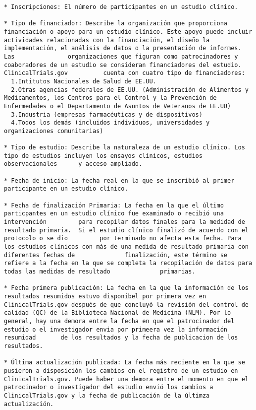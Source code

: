 \documentclass[
]{article}
\begin{document}
\begin{verbatim}
* Inscripciones: El número de participantes en un estudio clínico. 

* Tipo de financiador: Describe la organización que proporciona financiación o apoyo para un estudio clínico. Este apoyo puede incluir             actividades relacionadas con la financiación, el diseño la implementación, el análisis de datos o la presentación de informes. Las               organizaciones que figuran como patrocinadores y coaboradores de un estudio se consideran financiadores del estudio. ClinicalTrials.gov          cuenta con cuatro tipo de financiadores:
  1.Intitutos Nacionales de Salud de EE.UU.
  2.Otras agencias federales de EE.UU. (Administración de Alimentos y Medicamentos, los Centros para el Control y la Prevención de                 Enfermedades o el Departamento de Asuntos de Veteranos de EE.UU)
  3.Industria (empresas farmacéuticas y de dispositivos)
  4.Todos los demás (incluidos individuos, universidades y organizaciones comunitarias)

* Tipo de estudio: Describe la naturaleza de un estudio clínico. Los tipo de estudios incluyen los ensayos clínicos, estudios observacionales      y acceso ampliado.

* Fecha de inicio: La fecha real en la que se inscribió al primer participante en un estudio clínico. 

* Fecha de finalización Primaria: La fecha en la que el último particpantes en un estudio clínico fue examinado o recibió una intervención         para recopilar datos finales para la medidad de resultado primaria.  Si el estudio clínico finalizó de acuerdo con el protocolo o se dio         por terminado no afecta esta fecha. Para los estudios clínicos con más de una medida de resultado primaria con diferentes fechas de              finalización, este término se refiere a la fecha en la que se completa la recopilación de datos para todas las medidas de resultado              primarias. 

* Fecha primera publicación: La fecha en la que la información de los resultados resumidos estuvo disponibel por primera vez en                    ClinicalTrials.gov después de que concluyó la revisión del control de calidad (QC) de la Biblioteca Nacional de Medicina (NLM). Por lo           general, hay una demora entre la fecha en que el patrocinador del estudio o el investigador envia por primeera vez la información resumidad       de los resultados y la fecha de publicacion de los resultados. 

* Última actualización publicada: La fecha más reciente en la que se pusieron a disposición los cambios en el registro de un estudio en            ClinicalTrials.gov. Puede haber una demora entre el momento en que el patrocinador o investigador del estudio envió los cambios a                ClinicalTrials.gov y la fecha de publicación de la últimza actualización.


\end{verbatim}
\end{document}
